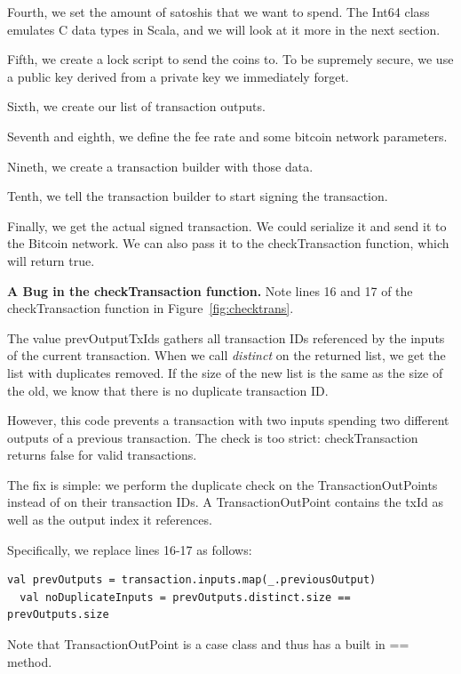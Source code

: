 \documentclass[runningheads]{llncs}
\renewcommand{\paragraph}{\textbf}%
\begin{document}
Fourth, we set the amount of satoshis that we want to spend. The Int64
class emulates C data types in Scala, and we will look at it more in
the next section.

Fifth, we create a lock script to send the coins to. To be supremely
secure, we use a public key derived from a private key we immediately
forget.

Sixth, we create our list of transaction outputs.

Seventh and eighth, we define the fee rate and some bitcoin network parameters.  

Nineth, we create a transaction builder with those data.

Tenth, we tell the transaction builder to start signing the transaction.

Finally, we get the actual signed transaction. We could serialize it
and send it to the Bitcoin network. We can also pass it to the
checkTransaction function, which will return true.

\paragraph{A Bug in the checkTransaction function.} Note lines 16 and
17 of the checkTransaction function in Figure~\ref{fig:checktrans}.

The value prevOutputTxIds gathers all transaction IDs referenced by
the inputs of the current transaction.  When we call \emph{distinct}
on the returned list, we get the list with duplicates removed.  If the
size of the new list is the same as the size of the old, we know that
there is no duplicate transaction ID.

However, this code prevents a transaction with two inputs spending two
different outputs of a previous transaction. The check is too strict:
checkTransaction returns false for valid transactions.

The fix is simple: we perform the duplicate check on the
TransactionOutPoints instead of on their transaction IDs.  A
TransactionOutPoint contains the txId as well as the output index it
references.

Specifically, we replace lines 16-17 as follows:
\begin{lstlisting}[style=scala, firstnumber=16]
  val prevOutputs = transaction.inputs.map(_.previousOutput)
  val noDuplicateInputs = prevOutputs.distinct.size == prevOutputs.size
\end{lstlisting}

Note that TransactionOutPoint is a case class and thus has a built in
== method.
\end{document}

